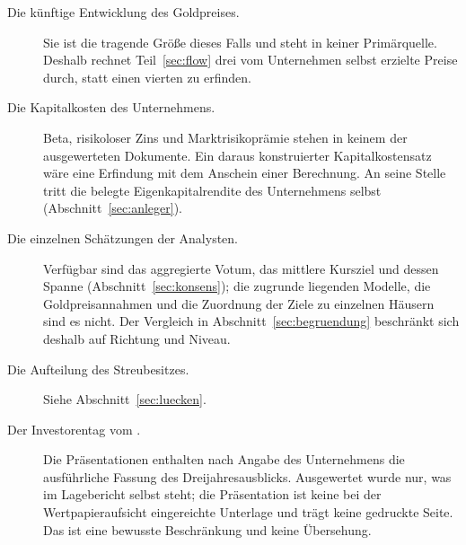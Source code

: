 \begin{description}
\item[Die k\"unftige Entwicklung des Goldpreises.] Sie ist die tragende
Gr\"o{\ss}e dieses Falls und steht in keiner Prim\"arquelle. Deshalb rechnet
Teil~\ref{sec:flow} drei vom Unternehmen selbst erzielte Preise durch, statt
einen vierten zu erfinden.

\item[Die Kapitalkosten des Unternehmens.] Beta, risikoloser Zins und
Marktrisikopr\"amie stehen in keinem der ausgewerteten Dokumente. Ein daraus
konstruierter Kapitalkostensatz w\"are eine Erfindung mit dem Anschein einer
Berechnung. An seine Stelle tritt die belegte Eigenkapitalrendite des
Unternehmens selbst (Abschnitt~\ref{sec:anleger}).

\item[Die einzelnen Sch\"atzungen der Analysten.] Verf\"ugbar sind das
aggregierte Votum, das mittlere Kursziel und dessen Spanne
(Abschnitt~\ref{sec:konsens}); die zugrunde liegenden Modelle, die
Goldpreisannahmen und die Zuordnung der Ziele zu einzelnen H\"ausern sind es
nicht. Der Vergleich in Abschnitt~\ref{sec:begruendung} beschr\"ankt sich
deshalb auf Richtung und Niveau.

\item[Die Aufteilung des Streubesitzes.] Siehe Abschnitt~\ref{sec:luecken}.

\item[Der Investorentag vom .] Die Pr\"asentationen
enthalten nach Angabe des Unternehmens die ausf\"uhrliche Fassung des
Dreijahresausblicks. Ausgewertet wurde nur, was
im Lagebericht selbst steht; die Pr\"asentation ist keine bei der
Wertpapieraufsicht eingereichte Unterlage und tr\"agt keine gedruckte Seite.
Das ist eine bewusste Beschr\"ankung und keine \"Ubersehung.
\end{description}
